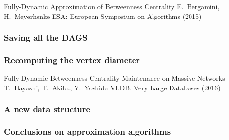 \begin{frame}
  \centering
  \vfill
  {\huge Fully-Dynamic Approximation of Betweenness Centrality}
  \vfill
  {\Large E.~Bergamini, H.~Meyerhenke}
  \vfill
  {\large ESA: European Symposium on Algorithms (2015)}
  \vfill
\end{frame}

\begin{frame}
  \frametitle{Saving all the DAGS}
\end{frame}

\begin{frame}
  \frametitle{Recomputing the vertex diameter}
\end{frame}

\begin{frame}
  \centering
  \vfill
  {\huge Fully Dynamic Betweenness Centrality Maintenance on Massive
  Networks}
  \vfill
  {\Large T.~Hayashi, T.~Akiba, Y.~Yoshida}
  \vfill
  {\large VLDB: Very Large Databases (2016)}
  \vfill
\end{frame}

\begin{frame}
  \frametitle{A new data structure}
\end{frame}

\begin{frame}
  \frametitle{Conclusions on approximation algorithms}
\end{frame}
